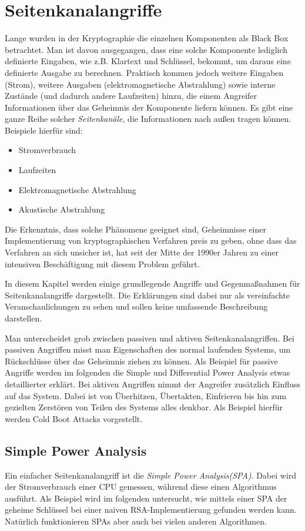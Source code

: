 \chapter{Seitenkanalangriffe}
\label{sec:seitenkanalangriffe}
Lange wurden in der Kryptographie die einzelnen Komponenten als Black
Box betrachtet. Man ist davon ausgegangen, dass eine solche Komponente
lediglich definierte Eingaben, wie z.B. Klartext und Schlüssel, bekommt,
um daraus eine definierte Ausgabe zu berechnen. Praktisch kommen jedoch
weitere Eingaben (Strom), weitere Ausgaben (elektromagnetische
Abstrahlung) sowie interne Zustände (und dadurch andere Laufzeiten)
hinzu, die einem Angreifer Informationen über das Geheimnis der
Komponente liefern können. Es gibt eine ganze Reihe solcher
\emph{Seitenkanäle}, die Informationen nach außen tragen
können. Beispiele hierfür sind:
\begin{itemize}
\item Stromverbrauch
\item Laufzeiten
\item Elektromagnetische Abstrahlung
\item Akustische Abstrahlung
\end{itemize}

Die Erkenntnis, dass solche Phänomene geeignet sind, Geheimnisse einer
Implementierung von kryptographischen Verfahren preis zu geben, ohne
dass das Verfahren an sich unsicher ist, hat seit der Mitte der 1990er
Jahren zu einer intensiven Beschäftigung mit diesem Problem geführt. 

In diesem Kapitel werden einige grundlegende Angriffe und Gegenmaßnahmen
für Seitenkanalangriffe dargestellt. Die Erklärungen sind dabei nur als
vereinfachte Veranschaulichungen zu sehen und sollen keine umfassende
Beschreibung darstellen.

Man unterscheidet grob zwischen passiven und aktiven
Seitenkanalangriffen. Bei passiven Angriffen misst man Eigenschaften des
normal laufenden Systems, um Rückschlüsse über das Geheimnis ziehen zu
können. Als Beispiel für passive Angriffe werden im folgenden die Simple
und Differential Power Analysis etwas detaillierter erklärt. Bei aktiven
Angriffen nimmt der Angreifer zusätzlich Einfluss auf das System. Dabei
ist von Überhitzen, Übertakten, Einfrieren bis hin zum gezielten
Zerstören von Teilen des Systems alles denkbar. Als Beispiel hierfür
werden Cold Boot Attacks vorgestellt. 

\section{Simple Power Analysis}
\label{sec:simple-power-analys}
Ein einfacher Seitenkanalangriff ist die \emph{Simple Power
  Analysis(SPA)}. Dabei wird der Stromverbrauch einer CPU gemessen,
während diese einen Algorithmus ausführt. Als Beispiel wird im folgenden
untersucht, wie mittels einer SPA der geheime Schlüssel bei einer naiven
RSA-Implementierung gefunden werden kann. Natürlich funktionieren SPAs
aber auch bei vielen anderen Algorithmen.
